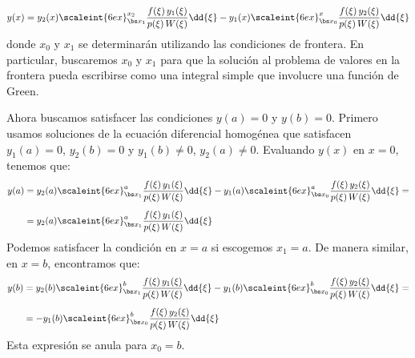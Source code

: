 \begin{align*}
y (x) = y_{2} (x) \scaleint{6ex}_{\bs x_{1}}^{x_{2}} \dfrac{f (\xi) \, y_{1} (\xi)}{p (\xi) \, W (\xi)} \dd{\xi} - y_{1} (x) \scaleint{6ex}_{\bs x_{0}}^{x} \dfrac{f (\xi) \, y_{2} (\xi)}{p (\xi) \, W (\xi)} \dd{\xi}
\end{align*}
donde $x_{0}$ y $x_{1}$ se determinarán utilizando las condiciones de frontera. En particular, buscaremos $x_{0}$ y $x_{1}$ para que la solución al problema de valores en la frontera pueda escribirse como una integral simple que involucre una función de Green. %
\par
Ahora buscamos satisfacer las condiciones $y (a) = 0$ y $y (b) = 0$. Primero usamos soluciones de la ecuación diferencial homogénea que satisfacen $y_{1} (a) = 0$, $y_{2} (b) = 0$ y $y_{1} (b) \neq 0$, $y_{2} (a) \neq 0$. Evaluando $y (x)$ en $x = 0$, tenemos que:
\begin{align}
\begin{aligned}[b]
y (a) &= y_{2} (a) \scaleint{6ex}_{\bs x_{1}}^{a} \dfrac{f (\xi) \, y_{1} (\xi)}{p (\xi) \, W (\xi)} \dd{\xi} - y_{1} (a) \scaleint{6ex}_{\bs x_{0}}^{a} \dfrac{f (\xi) \, y_{2} (\xi)}{p (\xi) \, W (\xi)} \dd{\xi} = \\[0.5em]
&= y_{2} (a) \scaleint{6ex}_{\bs x_{1}}^{a} \dfrac{f (\xi) \, y_{1} (\xi)}{p (\xi) \, W (\xi)} \dd{\xi}
\end{aligned}
\label{eq:ecuacion_07_27}
\end{align}
Podemos satisfacer la condición en $x = a$ si escogemos $x_{1} = a$. De manera similar, en $x = b$, encontramos que:
\begin{align}
\begin{aligned}[b]
y (b) &= y_{2} (b) \scaleint{6ex}_{\bs x_{1}}^{b} \dfrac{f (\xi) \, y_{1} (\xi)}{p (\xi) \, W (\xi)} \dd{\xi} - y_{1} (b) \scaleint{6ex}_{\bs x_{0}}^{b} \dfrac{f (\xi) \, y_{2} (\xi)}{p (\xi) \, W (\xi)} \dd{\xi} = \\[0.5em]
&= - y_{1} (b) \scaleint{6ex}_{\bs x_{0}}^{b} \dfrac{f (\xi) \, y_{2} (\xi)}{p (\xi) \, W (\xi)} \dd{\xi}
\end{aligned}
\label{eq:ecuacion_07_28}
\end{align}
Esta expresión se anula para $x_{0} = b$.


